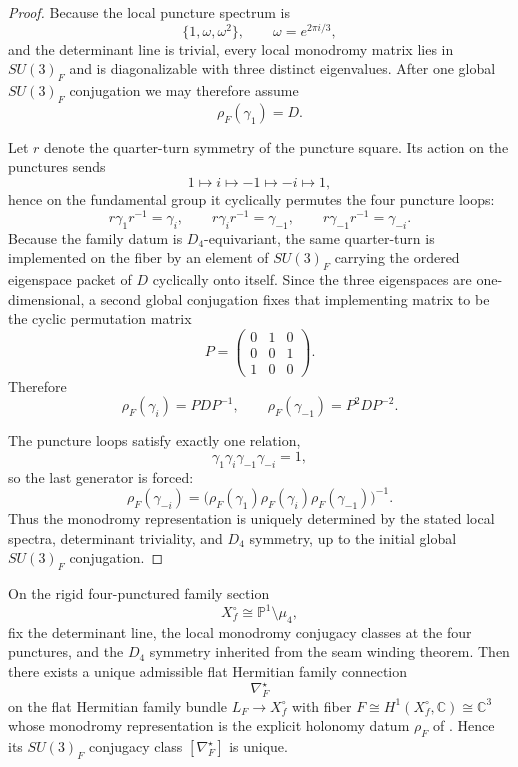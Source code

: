 \begin{proof}
Because the local puncture spectrum is
\[
\{1,\omega,\omega^2\},
\qquad
\omega=e^{2\pi i/3},
\]
and the determinant line is trivial, every local monodromy matrix lies in $SU(3)_F$ and is
diagonalizable with three distinct eigenvalues. After one global $SU(3)_F$ conjugation we may
therefore assume
\[
\rho_F(\gamma_1)=D.
\]

Let $r$ denote the quarter-turn symmetry of the puncture square. Its action on the punctures sends
\[
1\mapsto i\mapsto -1\mapsto -i\mapsto 1,
\]
hence on the fundamental group it cyclically permutes the four puncture loops:
\[
r\gamma_1r^{-1}=\gamma_i,
\qquad
r\gamma_ir^{-1}=\gamma_{-1},
\qquad
r\gamma_{-1}r^{-1}=\gamma_{-i}.
\]
Because the family datum is $D_4$-equivariant, the same quarter-turn is implemented on the fiber by
an element of $SU(3)_F$ carrying the ordered eigenspace packet of $D$ cyclically onto itself. Since
the three eigenspaces are one-dimensional, a second global conjugation fixes that implementing
matrix to be the cyclic permutation matrix
\[
P=
\begin{pmatrix}
0&1&0\\
0&0&1\\
1&0&0
\end{pmatrix}.
\]
Therefore
\[
\rho_F(\gamma_i)=PDP^{-1},
\qquad
\rho_F(\gamma_{-1})=P^2DP^{-2}.
\]

The puncture loops satisfy exactly one relation,
\[
\gamma_1\gamma_i\gamma_{-1}\gamma_{-i}=1,
\]
so the last generator is forced:
\[
\rho_F(\gamma_{-i})
=
\bigl(\rho_F(\gamma_1)\rho_F(\gamma_i)\rho_F(\gamma_{-1})\bigr)^{-1}.
\]
Thus the monodromy representation is uniquely determined by the stated local spectra, determinant
triviality, and $D_4$ symmetry, up to the initial global $SU(3)_F$ conjugation.
\end{proof}

\begin{theorem}
\label{thm:rigid-family-local-system}
On the rigid four-punctured family section
\[
X_f^\circ\cong \mathbb P^1\setminus\mu_4,
\]
fix the determinant line, the local monodromy conjugacy classes at the four punctures, and the
$D_4$ symmetry inherited from the seam winding theorem. Then there exists a unique admissible
flat Hermitian family connection
\[
\nabla_F^\star
\]
on the flat Hermitian family bundle $L_F\to X_f^\circ$ with fiber
$F\cong H^1(X_f^\circ,\mathbb C)\cong\mathbb C^3$ whose monodromy representation is the explicit
holonomy datum $\rho_F$ of
. Hence its $SU(3)_F$
conjugacy class $[\nabla_F^\star]$ is unique.
\end{theorem}
